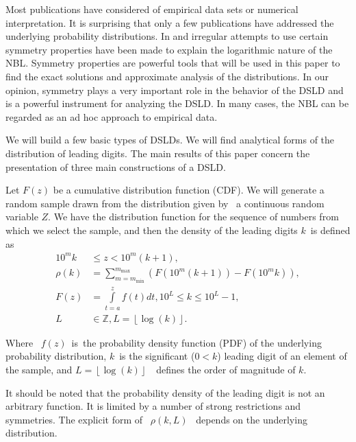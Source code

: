 \documentclass[titlepage,fleqn]{article}%
\providecommand{\U}[1]{\protect\rule{.1in}{.1in}}
\begin{document}
Most publications have considered of empirical data sets or numerical
interpretation. It is surprising that only a few publications have addressed
the underlying probability distributions. In
\cite{pinkham} and \cite{raimi}
irregular attempts to use certain symmetry properties have been made to
explain the logarithmic nature of the NBL. Symmetry properties are powerful
tools that will be used in this paper to find the exact solutions and
approximate analysis of the distributions. In our opinion, symmetry plays a
very important role in the behavior of the DSLD and is a powerful instrument
for analyzing the DSLD. In many cases, the NBL can be regarded as an ad hoc
approach to empirical data.

We will build a few basic types of DSLDs. We will find analytical forms of the
distribution of leading digits. The main results of this paper concern the
presentation of three main constructions of a DSLD.

Let $F(z)$ be a cumulative distribution function (CDF). We will generate a
random sample drawn from the distribution given by \ a continuous random
variable $Z$. We have the distribution function for the sequence of numbers
from which we select the sample, and then the density of the leading digits
$k$\ is defined as\bigskip%
\begin{align}
10^{m}k  &  \leq z<10^{m}(k+1),\label{MainFormulation}\\
\rho(k)  &  =%
{\displaystyle\sum\limits_{m=m_{\min}}^{m_{\max}}}
\left(  F(10^{m}(k+1))-F(10^{m}k)\right)  ,\\
F(z)  &  =%
{\displaystyle\int\limits_{t=a}^{z}}
f(t)dt,10^{L}\leq k\leq10^{L}-1,\nonumber\\
L  &  \in%
\mathbb{Z}
,L=\left\lfloor \log(k)\right\rfloor .\nonumber
\end{align}


Where \ $f(z)$\ is\ the probability density function (PDF) of the underlying
probability distribution, $k$\ is the significant ($0<k$) leading digit of an
element of the sample, and $L=\left\lfloor \log(k)\right\rfloor $\ \ defines
the order of magnitude of $k$.

It should be noted that the probability density of the leading digit is not an
arbitrary function. It is limited by a number of strong restrictions and
symmetries. The explicit form of \ $\rho(k,L)$ \ depends on the underlying distribution.
\end{document}
